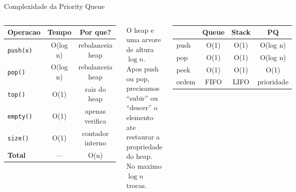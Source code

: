 \documentclass[aspectratio=169,11pt]{beamer}
\begin{document}
\begin{frame}{Complexidade da Priority Queue}
  \begin{columns}[c]
      \begin{tcolorbox}[caixaRoxa,title={Tabela de Complexidade}]
        \centering\small
        \begin{tabular}{lcc}
          \toprule
          \textbf{Operacao} & \textbf{Tempo} & \textbf{Por que?}\\
          \midrule
          \texttt{push(x)}  & O(log n) & rebalanceia heap\\
          \texttt{pop()}    & O(log n) & rebalanceia heap\\
          \texttt{top()}    & O(1)     & raiz do heap\\
          \texttt{empty()}  & O(1)     & apenas verifica\\
          \texttt{size()}   & O(1)     & contador interno\\
          \midrule
          \textbf{Total}    & ---      & O(n)\\
          \bottomrule
        \end{tabular}
      \end{tcolorbox}
      \vspace{0.15cm}
      \begin{tcolorbox}[caixaVerde,title={Intuicao do O(log n)}]
        \small
        O heap e uma arvore de altura $\log n$.
        Apos push ou pop, precisamos
        ``subir'' ou ``descer'' o elemento
        ate restaurar a propriedade do heap.
        No maximo $\log n$ trocas.
      \end{tcolorbox}
      \begin{tcolorbox}[caixaAmarelo,title={Comparacao geral}]
        \small
        \begin{tabular}{lccc}
          \toprule
          & \textbf{Queue} & \textbf{Stack} & \textbf{PQ}\\
          \midrule
          push & O(1) & O(1) & O(log n)\\
          pop  & O(1) & O(1) & O(log n)\\
          peek & O(1) & O(1) & O(1)\\
          \midrule
          ordem & FIFO & LIFO & prioridade\\
          \bottomrule

\end{tabular}
\end{tcolorbox}
\end{columns}
\end{frame}
\end{document}
